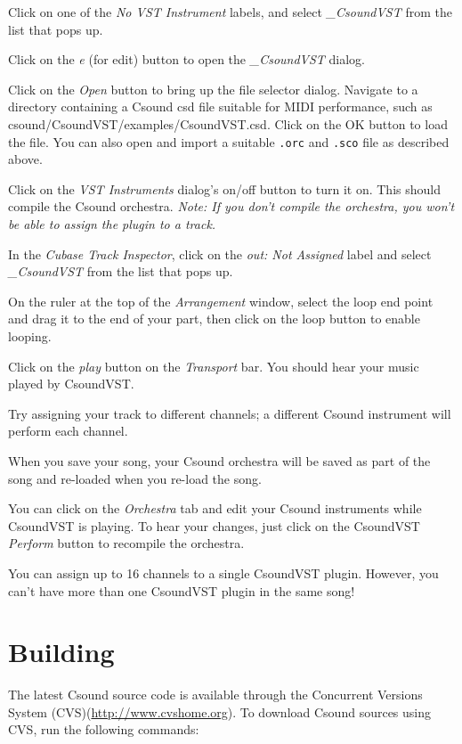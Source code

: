 \documentclass[10pt,letterpaper,onecolumn]{book}
\begin{document}
Click on one of the \emph{No VST Instrument} labels, and select \emph{\_CsoundVST} from the list that pops up. 

Click on the \emph{e} (for edit) button to open the \emph{\_CsoundVST} dialog. 

Click on the \emph{Open} button to bring up the file selector dialog. Navigate to a directory containing a Csound csd file suitable for MIDI performance, such as csound/CsoundVST/examples/CsoundVST.csd. Click on the OK button to load the file. You can also open and import a suitable \texttt{.orc} and \texttt{.sco} file as described above. 

Click on the \emph{VST Instruments} dialog's on/off button to turn it on. This should compile the Csound orchestra. \emph{Note: If you don't compile the orchestra, you won't be able to assign the plugin to a track.} 

In the \emph{Cubase Track Inspector}, click on the \emph{out: Not Assigned} label and select \emph{\_CsoundVST} from the list that pops up. 

On the ruler at the top of the \emph{Arrangement} window, select the loop end point and drag it to the end of your part, then click on the loop button to enable looping. 

Click on the \emph{play} button on the \emph{Transport} bar. You should hear your music played by CsoundVST. 

Try assigning your track to different channels; a different Csound instrument will perform each channel. 

When you save your song, your Csound orchestra will be saved as part of the song and re-loaded when you re-load the song. 

You can click on the \emph{Orchestra} tab and edit your Csound instruments while CsoundVST is playing. To hear your changes, just click on the CsoundVST \emph{Perform} button to recompile the orchestra. 

You can assign up to 16 channels to a single CsoundVST plugin. However, you can't have more than one CsoundVST plugin in the same song! 

\chapter{Building}

The latest Csound source code is available through the Concurrent Versions System (CVS)(\url{http://www.cvshome.org}). To download Csound sources using CVS, run the following commands:
\end{document}
